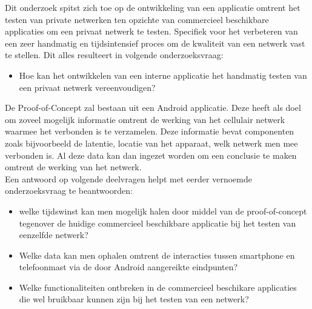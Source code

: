 Dit onderzoek spitst zich toe op de ontwikkeling van een applicatie omtrent het testen van private netwerken ten opzichte van commercieel beschikbare applicaties om een privaat netwerk te testen. Specifiek voor het verbeteren van een zeer handmatig en tijdsintensief proces om de kwaliteit van een netwerk vast te stellen. Dit alles resulteert in volgende onderzoeksvraag:
\begin{itemize}
    \item Hoe kan het ontwikkelen van een interne applicatie het handmatig testen van een privaat netwerk vereenvoudigen?
\end{itemize}

De Proof-of-Concept zal bestaan uit een Android applicatie. Deze heeft als doel om zoveel mogelijk informatie omtrent de werking van het cellulair netwerk waarmee het verbonden is te verzamelen. Deze informatie bevat componenten zoals bijvoorbeeld de latentie, locatie van het apparaat, welk netwerk men mee verbonden is. Al deze data kan dan ingezet worden om een conclusie te maken omtrent de werking van het netwerk. \\

Een antwoord op volgende deelvragen helpt met eerder vernoemde onderzoeksvraag te beantwoorden:

\begin{itemize}
    \item welke tijdswinst kan men mogelijk halen door middel van de proof-of-concept tegenover de huidige commercieel beschikbare applicatie bij het testen van eenzelfde netwerk?
    \item Welke data kan men ophalen omtrent de interacties tussen smartphone en telefoonmast via de door Android aangereikte eindpunten?
    \item Welke functionaliteiten ontbreken in de commercieel beschikare applicaties die wel bruikbaar kunnen zijn bij het testen van een netwerk?
\end{itemize}

\section{}%
\label{sec:onderzoeksdoelstelling}


